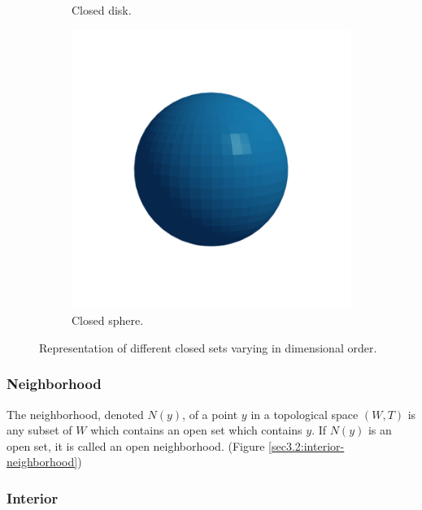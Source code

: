 \documentclass[a4paper,11pt,oneside]{article}
\begin{document}
\begin{figure}[ht]
\begin{subfigure}[b]{0.2\textwidth}
		\caption{Closed disk.}
	\end{subfigure}
	\hfill
	\begin{subfigure}[b]{0.2\textwidth}
		\centering
		\includegraphics[width=\textwidth]{section3/3.2/closed-sphere.png}
		\caption{Closed sphere.}
	\end{subfigure}
	\hfill
	\caption{Representation of different closed sets varying in dimensional order.}
	\label{sec3.2:closed-sets}
\end{figure}

\subsubsection{Neighborhood}
     
\begin{definition}
	The neighborhood, denoted $N(y)$, of a point $y$ in a topological space $(W, T)$ is any subset of $W$ which contains an open set which contains $y$. If $N(y)$ is an open set, it is called an open neighborhood. \cite{Requicha1978MathematicalFO} (Figure \ref{sec3.2:interior-neighborhood})
\end{definition}
    
\subsubsection{Interior}
     
\end{document}
